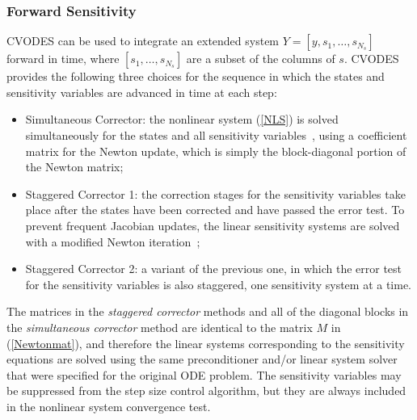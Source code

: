 \subsubsection{Forward Sensitivity}
CVODES can be used to integrate an extended system 
$Y = [y,s_1,\ldots,s_{N_s}]$ forward in time, where
$[s_1,\ldots,s_{N_s}]$ are a subset of the columns of $s$.
%
CVODES provides the following three choices for the sequence in which
the states and sensitivity variables are advanced in time at each step:
%
\begin{itemize}
\item Simultaneous Corrector: the nonlinear system (\ref{NLS}) is solved
  simultaneously for the states and all sensitivity variables~\cite{MaPe:97},
  using a coefficient matrix for the Newton update, which is
  simply the block-diagonal portion of the Newton matrix;
\item Staggered Corrector 1: the correction stages for the sensitivity 
  variables take place after the states have been corrected and have passed 
  the error test. To prevent frequent Jacobian updates, the linear sensitivity 
  systems are solved with a modified Newton iteration~\cite{FTB:97};
\item Staggered Corrector 2: a variant of the previous one,
  in which the error test for the sensitivity variables is also staggered,
  one sensitivity system at a time.
\end{itemize}
%
The matrices in the {\em staggered corrector} methods and all of the 
diagonal blocks in the {\em simultaneous corrector} method are 
identical to the matrix $M$ in (\ref{Newtonmat}), and 
therefore the linear systems corresponding to the sensitivity equations
are solved using the same preconditioner and/or linear system solver that 
were specified for the original ODE problem. 
The sensitivity variables may be suppressed from the step size control
algorithm, but they are always included in the nonlinear system convergence
test.

